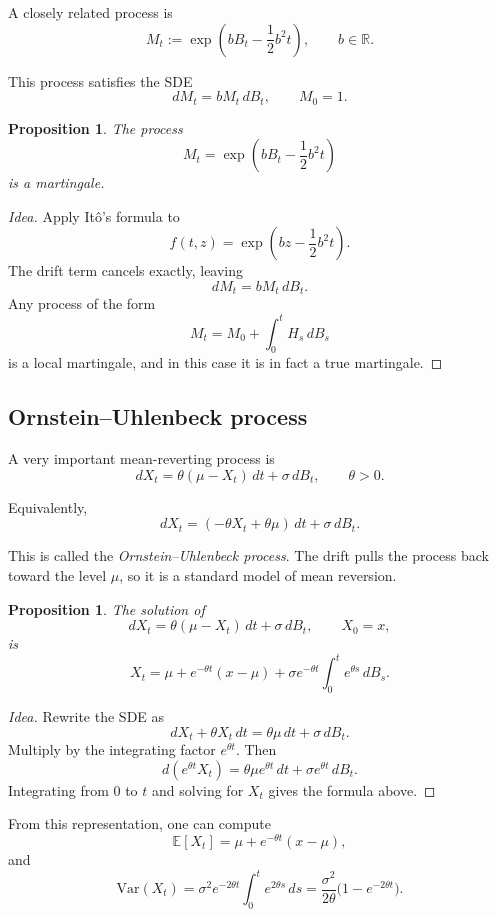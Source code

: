\documentclass[11pt]{article}
\newtheorem{proposition}[theorem]{Proposition}
\theoremstyle{definition}
\begin{document}
A closely related process is
\[
M_t := \exp\!\left(bB_t-\frac12 b^2 t\right),
\qquad b\in\mathbb R.
\]

This process satisfies the SDE
\[
dM_t = bM_t\,dB_t,
\qquad M_0=1.
\]

\begin{proposition}
The process
\[
M_t = \exp\!\left(bB_t-\frac12 b^2 t\right)
\]
is a martingale.
\end{proposition}

\begin{proof}[Idea]
Apply It\^o's formula to
\[
f(t,z)=\exp\!\left(bz-\frac12 b^2 t\right).
\]
The drift term cancels exactly, leaving
\[
dM_t=bM_t\,dB_t.
\]
Any process of the form
\[
M_t=M_0+\int_0^t H_s\,dB_s
\]
is a local martingale, and in this case it is in fact a true martingale.
\end{proof}

\subsection{Ornstein--Uhlenbeck process}

A very important mean-reverting process is
\[
dX_t = \theta(\mu-X_t)\,dt + \sigma\,dB_t,
\qquad \theta>0.
\]

Equivalently,
\[
dX_t = (-\theta X_t+\theta\mu)\,dt+\sigma\,dB_t.
\]

This is called the \emph{Ornstein--Uhlenbeck process}. The drift pulls the process back toward the level \(\mu\), so it is a standard model of mean reversion.

\begin{proposition}
The solution of
\[
dX_t = \theta(\mu-X_t)\,dt + \sigma\,dB_t,
\qquad X_0=x,
\]
is
\[
X_t
=
\mu + e^{-\theta t}(x-\mu)
+ \sigma e^{-\theta t}\int_0^t e^{\theta s}\,dB_s.
\]
\end{proposition}

\begin{proof}[Idea]
Rewrite the SDE as
\[
dX_t + \theta X_t\,dt = \theta\mu\,dt+\sigma\,dB_t.
\]
Multiply by the integrating factor \(e^{\theta t}\). Then
\[
d(e^{\theta t}X_t)=\theta\mu e^{\theta t}\,dt+\sigma e^{\theta t}\,dB_t.
\]
Integrating from \(0\) to \(t\) and solving for \(X_t\) gives the formula above.
\end{proof}

\medskip

\noindent
From this representation, one can compute
\[
\mathbb E[X_t]
=
\mu+e^{-\theta t}(x-\mu),
\]
and
\[
\mathrm{Var}(X_t)
=
\sigma^2 e^{-2\theta t}\int_0^t e^{2\theta s}\,ds
=
\frac{\sigma^2}{2\theta}\bigl(1-e^{-2\theta t}\bigr).
\]
\end{document}
